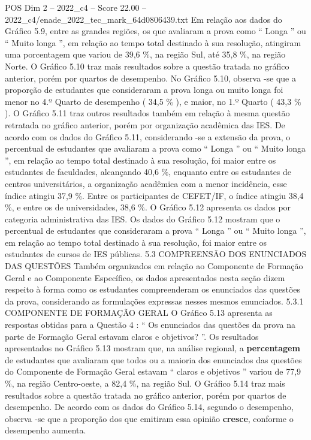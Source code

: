 \begin{textsample}{POS Dim 2 – 2022\_c4 – Score 22.00 – 2022\_c4/enade\_2022\_tec\_mark\_64d0806439.txt}
Em relação aos dados do Gráfico 5.9, entre as grandes regiões, os que avaliaram a prova como “ Longa ” ou “ Muito longa ”, em relação ao tempo total destinado à sua resolução, atingiram uma porcentagem que variou de 39,6 \%, na região Sul, até 35,8 \%, na região Norte.
O Gráfico 5.10 traz mais resultados sobre a questão tratada no gráfico anterior, porém por quartos de desempenho.
No Gráfico 5.10, observa -se que a proporção de estudantes que consideraram a prova longa ou muito longa foi menor no 4.º Quarto de desempenho ( 34,5 \% ), e maior, no 1.º Quarto ( 43,3 \% ).
O Gráfico 5.11 traz outros resultados também em relação à mesma questão retratada no gráfico anterior, porém por organização acadêmica das IES.
De acordo com os dados do Gráfico 5.11, considerando -se a extensão da prova, o percentual de estudantes que avaliaram a prova como “ Longa ” ou “ Muito longa ”, em relação ao tempo total destinado à sua resolução, foi maior entre os estudantes de faculdades, alcançando 40,6 \%, enquanto entre os estudantes de centros universitários, a organização acadêmica com a menor incidência, esse índice atingiu 37,9 \%.
Entre os participantes de CEFET/IF, o índice atingiu 38,4 \%, e entre os de universidades, 38,6 \%.
O Gráfico 5.12 apresenta os dados por categoria administrativa das IES.
Os dados do Gráfico 5.12 mostram que o percentual de estudantes que consideraram a prova “ Longa ” ou “ Muito longa ”, em relação ao tempo total destinado à sua resolução, foi maior entre os estudantes de cursos de IES públicas. 5.3 COMPREENSÃO DOS ENUNCIADOS DAS QUESTÕES Também organizados em relação ao Componente de Formação Geral e ao Componente Específico, os dados apresentados nesta seção dizem respeito à forma como os estudantes compreenderam os enunciados das questões da prova, considerando as formulações expressas nesses mesmos enunciados. 5.3.1 COMPONENTE DE FORMAÇÃO GERAL O Gráfico 5.13 apresenta as respostas obtidas para a Questão 4 : “ Os enunciados das questões da prova na parte de Formação Geral estavam claros e objetivos? ”.
Os resultados apresentados no Gráfico 5.13 mostram que, na análise regional, a \textbf{percentagem} de estudantes que avaliaram que todos ou a maioria dos enunciados das questões do Componente de Formação Geral estavam “ claros e objetivos ” variou de 77,9 \%, na região Centro-oeste, a 82,4 \%, na região Sul.
O Gráfico 5.14 traz mais resultados sobre a questão tratada no gráfico anterior, porém por quartos de desempenho.
De acordo com os dados do Gráfico 5.14, segundo o desempenho, observa -se que a proporção dos que emitiram essa opinião \textbf{cresce}, conforme o desempenho aumenta.

\end{textsample}
